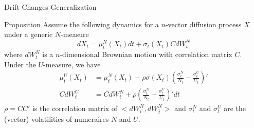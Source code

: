 \documentclass{beamer}
\begin{document}
	\begin{frame}{Drift Changes Generalization}
		\begin{block}{Proposition}
			Assume the following dynamics for a $n$-vector diffusion process $X$ under a generic $N$-measure
			\begin{equation*}
				dX_t = \mu_t^N(X_t)dt + \sigma_t(X_t)CdW^N_t
			\end{equation*}
			where $dW^N_t$ is a $n$-dimensional Brownian motion with correlation matrix $C$. Under the $U$-measure, we have
			\begin{align}
				\mu^U_t(X_t) &= \mu^N_t(X_t) - \rho\sigma(X_t)\left(\frac{\sigma^N_t}{N_t}-\frac{\sigma^U_t}{U_t}\right)' \\
				CdW^U_t &= CdW^N_t + \rho\left(\frac{\sigma^N_t}{N_t}-\frac{\sigma^U_t}{U_t}\right)' dt
			\end{align}
$\rho=CC'$ is the correlation matrix of $<dW^N_i,dW^N_j>$ and $\sigma^N_t$ and $\sigma^U_t$ are the (vector) volatilities of numeraires $N$ and $U$. %
		\end{block}
	\end{frame}
\end{document}
